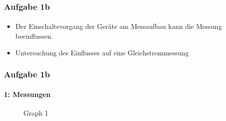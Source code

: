 \begin{frame}
\frametitle{Aufgabe 1b}
\framesubtitle{}
    \begin{itemize}
        \item Der Einschaltevorgang der Geräte am Messaufbau kann die Messung
    beeinflussen.
        \item Untersuchung des Einflusses auf eine Gleichstrommessung
    \end{itemize}
\end{frame}
\begin{frame}
\frametitle{Aufgabe 1b}
\framesubtitle{1: Messungen}
\begin{figure}[H]
\begin{center}
    \caption{Graph 1}
\end{center}
\end{figure}
\end{frame}

